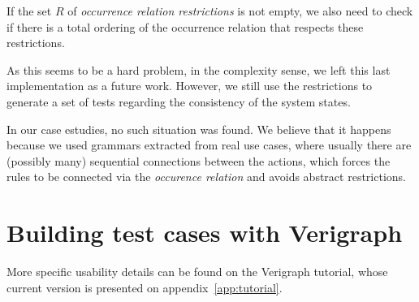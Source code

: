 If the set $R$ of \emph{occurrence relation restrictions} is not empty, we also need to check if there is a total ordering of the occurrence relation that respects these restrictions.

As this seems to be a hard problem, in the complexity sense, we left this last implementation as a future work. However, we still use the restrictions to generate a set of tests regarding the consistency of the system states.

In our case estudies, no such situation was found. We believe that it happens because we used grammars extracted from real use cases, where usually there are (possibly many) sequential connections between the actions, which forces the rules to be connected via the \emph{occurence relation} and avoids abstract restrictions.

\section{Building test cases with Verigraph}

More specific usability details can be found on the Verigraph tutorial, whose current version is presented on appendix~\ref{app:tutorial}.
